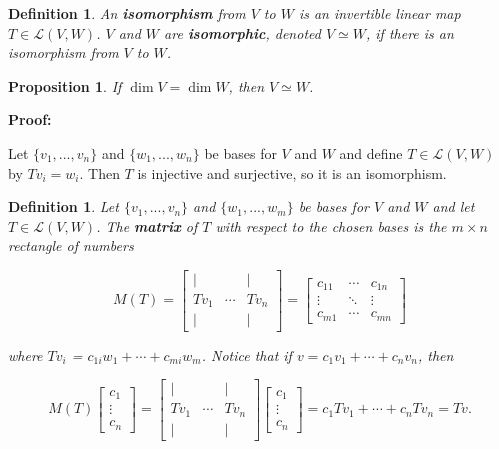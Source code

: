 \documentclass{article}
\theoremstyle{colontheorem}
\newtheorem{proposition}[theorem]{Proposition}
\newtheorem{definition}[theorem]{Definition}
\newenvironment{Proposition}
{
	\begin{mdframed}[backgroundcolor=TheoremOrange!10]
	\begin{proposition}
}
{
	\end{proposition}
	\end{mdframed}
	
	\vspace{.15in}
}
\newenvironment{Def}
{
	\begin{mdframed}[backgroundcolor=DefGreen!10]
	\begin{definition}
}
{
	\end{definition}
	\end{mdframed}
	
	\vspace{.15in}
}
\newenvironment{Proof}
{
	\vspace{-.3in}
	
	\begin{mdframed}[backgroundcolor=ProofPurple!10]
	\textbf{Proof:}%
}
{
	\end{mdframed}
	
	\vspace{.15in}
}
\begin{document}
\begin{Def}
	
	An \textbf{isomorphism} from $V$ to $W$ is an invertible linear map $T \in \mathcal{L}(V,W)$. $V$ and $W$ are \textbf{isomorphic}, denoted $V \simeq W$, if there is an isomorphism from $V$ to $W$.
	
\end{Def}



\begin{Proposition}
	
	If $\dim V = \dim W$, then $V \simeq W$.
	
\end{Proposition}



\begin{Proof}
	Let $\{v_1, ..., v_n\}$ and $\{w_1, ..., w_n\}$ be bases for $V$ and $W$ and define $T \in \mathcal{L}(V,W)$ by $Tv_i = w_i$. Then $T$ is injective and surjective, so it is an isomorphism.
	
\end{Proof}



\begin{Def}
	
	Let $\{v_1, ..., v_n\}$ and $\{w_1, ..., w_m\}$ be bases for $V$ and $W$ and let $T \in \mathcal{L}(V,W)$. The \textbf{matrix} of $T$ with respect to the chosen bases is the $m \times n$ rectangle of numbers
	
	$$
		M(T) = \begin{bmatrix}
			| & & |\\
			Tv_1 & \cdots & Tv_n\\
			| & & |
		\end{bmatrix} = \begin{bmatrix}
			c_{11} & \cdots & c_{1n}\\
			\vdots & \ddots & \vdots\\
			c_{m1} & \cdots & c_{mn}
		\end{bmatrix}
	$$
	
	where $Tv_i$ = $c_{1i} w_1 + \cdots + c_{mi} w_m$. Notice that if $v = c_1 v_1 + \cdots + c_n v_n$, then
	
	\pagebreak
	
	$$
		M(T) \begin{bmatrix}	
			c_1\\
			\vdots\\
			c_n
		\end{bmatrix} = \begin{bmatrix}
			| & & |\\
			Tv_1 & \cdots & Tv_n\\
			| & & |
		\end{bmatrix} \begin{bmatrix}	
			c_1\\
			\vdots\\
			c_n
		\end{bmatrix} = c_1 Tv_1 + \cdots + c_n Tv_n = Tv.
	$$
	
\end{Def}
\end{document}
